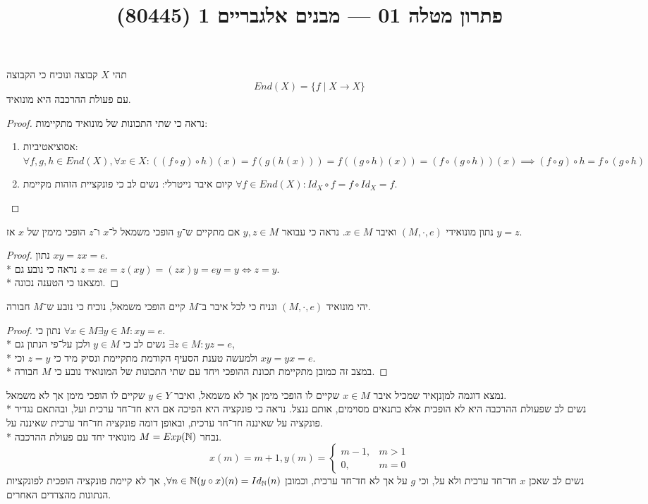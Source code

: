 
\title{פתרון מטלה 01 --- מבנים אלגבריים 1 (80445)}


\maketitle
\maketitleprint{}

\Question{}
\Subquestion{}
תהי $X$ קבוצה ונוכיח כי הקבוצה
\[
	End(X) = \{ f \mid X \to X \}
\]
עם פעולת ההרכבה היא מונואיד.
\begin{proof}
	נראה כי שתי התכונות של מונואיד מתקיימות:
	\begin{enumerate}
		\item אסוציאטיביות: $\forall f, g, h \in End(X), \forall x \in X : ((f \circ g) \circ h)(x) = f(g(h(x))) = f((g \circ h)(x)) = (f \circ (g \circ h))(x) \implies (f \circ g) \circ h = f \circ (g \circ h)$
		\item קיום איבר נייטרלי: נשים לב כי פונקציית הזהות מקיימת $\forall f \in End(X) : Id_X \circ f = f \circ Id_X = f$.
	\end{enumerate}
\end{proof}

\Subquestion{}
נתון מונואידי $(M, \cdot, e)$ ואיבר $x \in M$. נראה כי עבואר $y, z \in M$ אם מתקיים ש־$y$ הופכי משמאל ל־$x$ ו־$z$ הופכי מימין של $x$ אז $y = z$.
\begin{proof}
	נתון $x y = z x = e$. \\*
	נראה כי נובע גם $z = ze = z(xy) = (zx)y = ey = y \iff z = y$. \\*
	ומצאנו כי הטענה נכונה.
\end{proof}

\Subquestion{}
יהי מונואיד $(M, \cdot, e)$ ונניח כי לכל איבר ב־$M$ קיים הופכי משמאל, נוכיח כי נובע ש־$M$ חבורה.
\begin{proof}
	נתון כי $\forall x \in M \exists y \in M : x y  = e$. \\*
	נשים לב כי $y \in M$ ולכן על־פי הנתון גם $\exists z \in M : yz = e$, \\*
	ולמעשה טענת הסעיף הקודמת מתקיימת ונסיק מיד כי $z = y$ וכי $x y = y x = e$. \\*
	במצב זה כמובן מתקיימת תכונת ההופכי ויחד עם שתי התכונות של המונואיד נובע כי $M$ חבורה.
\end{proof}

\Subquestion{}
נמצא דוגמה למןנןאיד שמכיל איבר $x \in M$ שקיים לו הופכי מימן אך לא משמאל, ואיבר $y \in Y$ שקיים לו הופכי מימן אך לא משמאל. \\*
נשים לב שפעולת ההרכבה היא לא הופכית אלא בתנאים מסוימים, אותם ננצל. נראה כי פונקציה היא הפיכה אם היא חד־חד ערכית ועל, ובהתאם נגדיר פונקציה על שאיננה חד־חד ערכית, ובאופן דומה פונקציה חד־חד ערכית שאיננה על. \\*
נבחר $M = Exp(\mathbb{N})$ מונואיד יחד עם פעולת ההרכבה.
\[
	x(m) = m + 1, y(m) = \begin{cases}
		m - 1, & m > 1 \\
		0, & m = 0
	\end{cases}
\]
נשים לב שאכן $x$ חד־חד ערכית ולא על, וכי $g$ על אך לא חד־חד ערכית, וכמובן $\forall n \in \mathbb{N} (y \circ x)(n) = Id_{\mathbb{N}}(n)$, אך לא קיימת פונקציה הופכית לפונקציות הנתונות מהצדדים האחרים.


